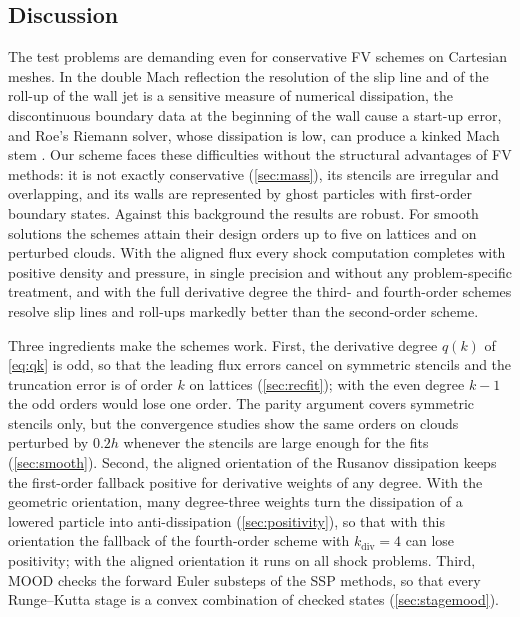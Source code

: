 \documentclass[smallextended]{svjour3}
\numberwithin{equation}{section}
\newcommand{\qdiv}{q}
\begin{document}
\subsection{Discussion}\label{sec:discussion}

The test problems are demanding even for conservative FV schemes on Cartesian meshes. In the double Mach reflection the resolution of the slip line and of the roll-up of the wall jet is a sensitive measure of numerical dissipation, the discontinuous boundary data at the beginning of the wall cause a start-up error, and Roe's Riemann solver, whose dissipation is low, can produce a kinked Mach stem \cite{Quirk1994}. Our scheme faces these difficulties without the structural advantages of FV methods: it is not exactly conservative (\cref{sec:mass}), its stencils are irregular and overlapping, and its walls are represented by ghost particles with first-order boundary states. Against this background the results are robust. For smooth solutions the schemes attain their design orders up to five on lattices and on perturbed clouds. With the aligned flux every shock computation completes with positive density and pressure, in single precision and without any problem-specific treatment, and with the full derivative degree the third- and fourth-order schemes resolve slip lines and roll-ups markedly better than the second-order scheme.

Three ingredients make the schemes work. First, the derivative degree $\qdiv(k)$ of \eqref{eq:qk} is odd, so that the leading flux errors cancel on symmetric stencils and the truncation error is of order $k$ on lattices (\cref{sec:recfit}); with the even degree $k-1$ the odd orders would lose one order. The parity argument covers symmetric stencils only, but the convergence studies show the same orders on clouds perturbed by $0.2h$ whenever the stencils are large enough for the fits (\cref{sec:smooth}). Second, the aligned orientation of the Rusanov dissipation keeps the first-order fallback positive for derivative weights of any degree. With the geometric orientation, many degree-three weights turn the dissipation of a lowered particle into anti-dissipation (\cref{sec:positivity}), so that with this orientation the fallback of the fourth-order scheme with $k_{\mathrm{div}}=4$ can lose positivity; with the aligned orientation it runs on all shock problems. Third, MOOD checks the forward Euler substeps of the SSP methods, so that every Runge--Kutta stage is a convex combination of checked states (\cref{sec:stagemood}).
\end{document}
